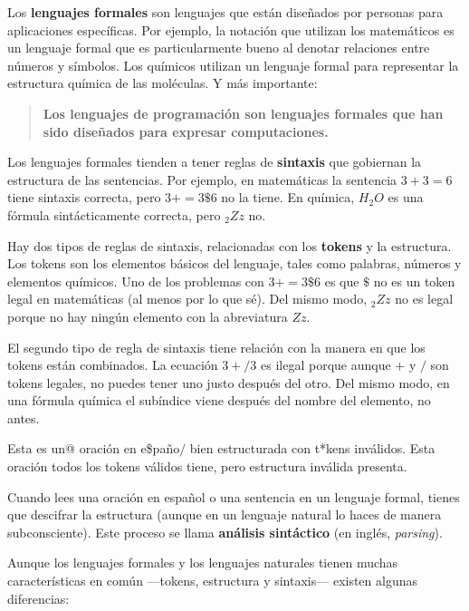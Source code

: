 \documentclass[10pt]{book}
\begin{document}
Los {\bf lenguajes formales} son lenguajes que están diseñados por personas
para aplicaciones específicas.  Por ejemplo, la notación que utilizan los
matemáticos es un lenguaje formal que es particularmente bueno al denotar
relaciones entre números y símbolos.  Los químicos utilizan un lenguaje formal
para representar la estructura química de las moléculas.  Y
más importante:

\begin{quote}
{\bf Los lenguajes de programación son lenguajes formales que han sido
diseñados para expresar computaciones.}
\end{quote}

Los lenguajes formales tienden a tener reglas de {\bf sintaxis} que
gobiernan la estructura de las sentencias.
Por ejemplo, en matemáticas la sentencia
$3 + 3 = 6$ tiene sintaxis correcta, pero
$3 + = 3 \$ 6$ no la tiene.  En química,
$H_2O$ es una fórmula sintácticamente correcta, pero $_2Zz$ no.

Hay dos tipos de reglas de sintaxis, relacionadas con los {\bf tokens} y la
estructura.  Los tokens son los elementos básicos del lenguaje, tales como
palabras, números y elementos químicos.  Uno de los problemas con
$3 += 3 \$ 6$ es que \( \$ \) no es un token legal en matemáticas
(al menos por lo que sé).  Del mismo modo, $_2Zz$ no es legal porque
no hay ningún elemento con la abreviatura $Zz$.

El segundo tipo de regla de sintaxis tiene relación con la manera en que los
tokens están combinados.  La ecuación $3 +/ 3$ es ilegal porque aunque $+$
y $/$ son tokens legales, no puedes tener uno justo después del otro.
Del mismo modo, en una fórmula química el subíndice viene después del nombre
del elemento, no antes.

Esta es un@ oración en e\$paño$/$ bien estructurada
con t*kens inválidos.  Esta oración todos los tokens válidos
tiene, pero estructura inválida presenta.

Cuando lees una oración en español o una sentencia en un lenguaje
formal, tienes que descifrar la estructura
(aunque en un lenguaje natural lo haces de manera subconsciente).  Este
proceso se llama {\bf análisis sintáctico} (en inglés, {\em parsing}).

Aunque los lenguajes formales y los lenguajes naturales tienen muchas características en
común ---tokens, estructura y sintaxis--- existen algunas
diferencias:
\end{document}
